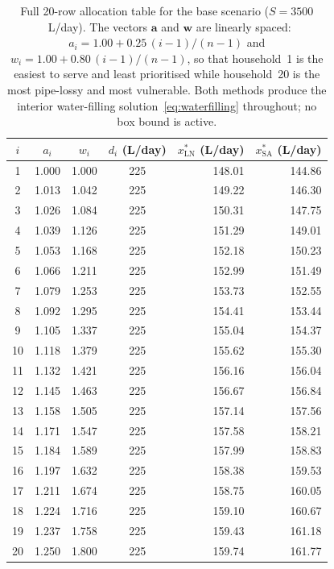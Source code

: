 \begin{table}[h]
\centering
\small
\caption{Full 20-row allocation table for the base scenario ($S=3500$~L/day).
The vectors $\mathbf{a}$ and $\mathbf{w}$ are linearly spaced:
$a_i = 1.00 + 0.25\,(i-1)/(n-1)$ and $w_i = 1.00 + 0.80\,(i-1)/(n-1)$,
so that household~1 is the easiest to serve and least prioritised
while household~20 is the most pipe-lossy and most vulnerable.
Both methods produce the interior water-filling solution~\eqref{eq:waterfilling}
throughout; no box bound is active.}
\label{tab:full_alloc}
\begin{tabular}{@{}ccccrr@{}}
\toprule
$i$ & $a_i$ & $w_i$ & $d_i$ (L/day) & $x^*_{\text{LN}}$ (L/day) & $x^*_{\text{SA}}$ (L/day) \\ \midrule
 1 & 1.000 & 1.000 & 225 & 148.01 & 144.86 \\
 2 & 1.013 & 1.042 & 225 & 149.22 & 146.30 \\
 3 & 1.026 & 1.084 & 225 & 150.31 & 147.75 \\
 4 & 1.039 & 1.126 & 225 & 151.29 & 149.01 \\
 5 & 1.053 & 1.168 & 225 & 152.18 & 150.23 \\
 6 & 1.066 & 1.211 & 225 & 152.99 & 151.49 \\
 7 & 1.079 & 1.253 & 225 & 153.73 & 152.55 \\
 8 & 1.092 & 1.295 & 225 & 154.41 & 153.44 \\
 9 & 1.105 & 1.337 & 225 & 155.04 & 154.37 \\
10 & 1.118 & 1.379 & 225 & 155.62 & 155.30 \\
11 & 1.132 & 1.421 & 225 & 156.16 & 156.04 \\
12 & 1.145 & 1.463 & 225 & 156.67 & 156.84 \\
13 & 1.158 & 1.505 & 225 & 157.14 & 157.56 \\
14 & 1.171 & 1.547 & 225 & 157.58 & 158.21 \\
15 & 1.184 & 1.589 & 225 & 157.99 & 158.83 \\
16 & 1.197 & 1.632 & 225 & 158.38 & 159.53 \\
17 & 1.211 & 1.674 & 225 & 158.75 & 160.05 \\
18 & 1.224 & 1.716 & 225 & 159.10 & 160.67 \\
19 & 1.237 & 1.758 & 225 & 159.43 & 161.18 \\
20 & 1.250 & 1.800 & 225 & 159.74 & 161.77 \\
\bottomrule
\end{tabular}
\end{table}

